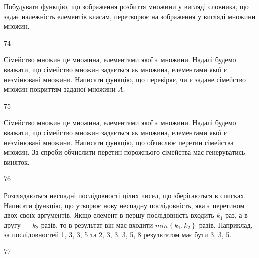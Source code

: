 Побудувати функцію, що зображення розбиття множини у вигляді словника, що задає належність елементів класам, перетворює на зображення у вигляді множини множин.
\\\par
74 














Сімейство множин це множина, елементами якої є множини. Надалі будемо вважати, що сімейство множин задається як множина, елементами якої є незмінювані множини. Написати функцію, що перевіряє, чи є задане сімейство множин покриттям заданої множини $A$.
\\\par
75 














Сімейство множин це множина, елементами якої є множини. Надалі будемо вважати, що сімейство множин задається як множина, елементами якої є незмінювані множини. Написати функцію, що обчислює перетин сімейства множин. За спроби обчислити перетин порожнього сімейства має генеруватись виняток.
\\\par
76 














Розглядаються неспадні послідовності цілих чисел, що зберігаються в списках. Написати функцію, що утворює нову неспадну послідовність, яка є перетином двох своїх аргументів. Якщо елемент в першу послідовність входить $k_1$ раз, а в другу --- $k_2$ разів, то в результат він має входити $min\left\{k_1,k_2\right\}$ разів. Наприклад, за послідовностей 1, 3, 3, 5 та 2, 3, 3, 3, 5, 8 результатом має бути 3, 3, 5.
\\\par
77 














